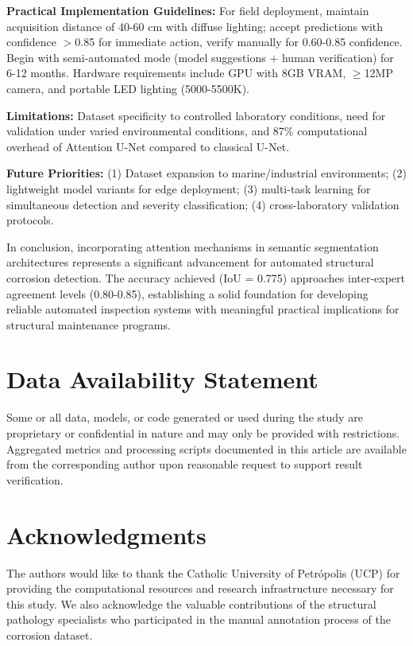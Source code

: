 \documentclass[Journal,letterpaper]{ascelike-new}
\begin{document}
\textbf{Practical Implementation Guidelines:} For field deployment, maintain acquisition distance of 40-60 cm with diffuse lighting; accept predictions with confidence $>$0.85 for immediate action, verify manually for 0.60-0.85 confidence. Begin with semi-automated mode (model suggestions + human verification) for 6-12 months. Hardware requirements include GPU with 8GB VRAM, $\geq$12MP camera, and portable LED lighting (5000-5500K).

\textbf{Limitations:} Dataset specificity to controlled laboratory conditions, need for validation under varied environmental conditions, and 87\% computational overhead of Attention U-Net compared to classical U-Net.

\textbf{Future Priorities:} (1) Dataset expansion to marine/industrial environments; (2) lightweight model variants for edge deployment; (3) multi-task learning for simultaneous detection and severity classification; (4) cross-laboratory validation protocols.

In conclusion, incorporating attention mechanisms in semantic segmentation architectures represents a significant advancement for automated structural corrosion detection. The accuracy achieved (IoU = 0.775) approaches inter-expert agreement levels (0.80-0.85), establishing a solid foundation for developing reliable automated inspection systems with meaningful practical implications for structural maintenance programs.


\section{Data Availability Statement}
Some or all data, models, or code generated or used during the study are proprietary or confidential in nature and may only be provided with restrictions. Aggregated metrics and processing scripts documented in this article are available from the corresponding author upon reasonable request to support result verification.

\section{Acknowledgments}
The authors would like to thank the Catholic University of Petrópolis (UCP) for providing the computational resources and research infrastructure necessary for this study. We also acknowledge the valuable contributions of the structural pathology specialists who participated in the manual annotation process of the corrosion dataset.
\end{document}
